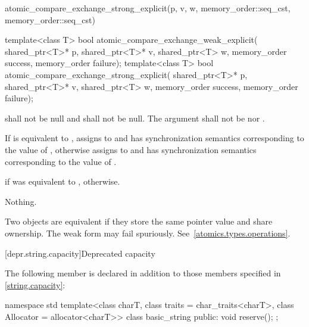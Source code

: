 \begin{itemdescr}
\pnum
\returns
\begin{codeblock}
atomic_compare_exchange_strong_explicit(p, v, w, memory_order::seq_cst,
                                        memory_order::seq_cst)
\end{codeblock}
\end{itemdescr}

%
%
\begin{itemdecl}
template<class T>
  bool atomic_compare_exchange_weak_explicit(
    shared_ptr<T>* p, shared_ptr<T>* v, shared_ptr<T> w,
    memory_order success, memory_order failure);
template<class T>
  bool atomic_compare_exchange_strong_explicit(
    shared_ptr<T>* p, shared_ptr<T>* v, shared_ptr<T> w,
    memory_order success, memory_order failure);
\end{itemdecl}

\begin{itemdescr}
\pnum
\requires {} shall not be null and  shall not be null.
The  argument shall not be  nor
.

\pnum
\effects
If  is equivalent to , assigns  to
 and has synchronization semantics corresponding to the value of
, otherwise assigns  to  and has
synchronization semantics corresponding to the value of .

\pnum
\returns
{} if  was equivalent to ,  otherwise.

\pnum
\throws
Nothing.

\pnum
\remarks
Two  objects are equivalent if they store the same
pointer value and share ownership.
The weak form may fail spuriously. See~\ref{atomics.types.operations}.
\end{itemdescr}

[depr.string.capacity]{Deprecated  capacity}

\pnum
The following member is declared in addition to those members specified
in \ref{string.capacity}:

%
\begin{codeblock}
namespace std {
  template<class charT, class traits = char_traits<charT>,
           class Allocator = allocator<charT>>
  class basic_string {
  public:
    void reserve();
  };
}
\end{codeblock}


